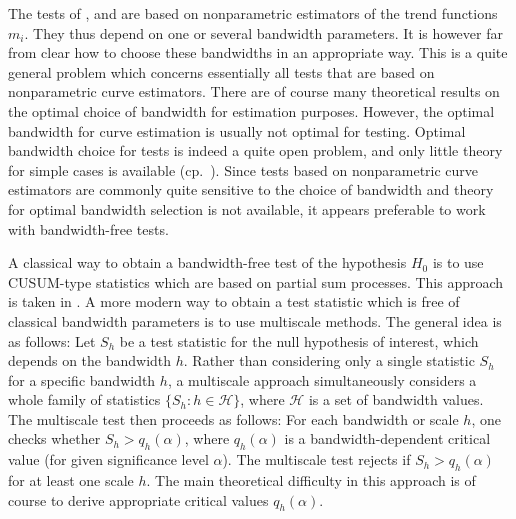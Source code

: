 \documentclass[a4paper,12pt]{article}
\begin{document}
The tests of \cite{Zhang2012}, \cite{DegrasWu2012} and \cite{ChenWu2018} are based on nonparametric estimators of the trend functions $m_i$. They thus depend on one or several bandwidth parameters. It is however far from clear how to choose these bandwidths in an appropriate way. This is a quite general problem which concerns essentially all tests that are based on nonparametric curve estimators. There are of course many theoretical results on the optimal choice of bandwidth for estimation purposes. However, the optimal bandwidth for curve estimation is usually not optimal for testing. Optimal bandwidth choice for tests is indeed a quite open problem, and only little theory for simple cases is available (cp.\ \cite{GaoGijbels2008}). Since tests based on nonparametric curve estimators are commonly quite sensitive to the choice of bandwidth and theory for optimal bandwidth selection is not available, it appears preferable to work with bandwidth-free tests. 


A classical way to obtain a bandwidth-free test of the hypothesis $H_0$ is to use CUSUM-type statistics which are based on partial sum processes. This approach is taken in \cite{Hidalgo2014}. 
%
%
A more modern way to obtain a test statistic which is free of classical bandwidth parameters is to use multiscale methods. The general idea is as follows: Let $S_h$ be a test statistic for the null hypothesis of interest, which depends on the bandwidth $h$. Rather than considering only a single statistic $S_h$ for a specific bandwidth $h$, a multiscale approach simultaneously considers a whole family of statistics $\{S_h: h \in \mathcal{H} \}$, where $\mathcal{H}$ is a set of bandwidth values. The multiscale test then proceeds as follows: For each bandwidth or scale $h$, one checks whether $S_h > q_h(\alpha)$, where $q_h(\alpha)$ is a bandwidth-dependent critical value (for given significance level $\alpha$). The multiscale test rejects if $S_h > q_h(\alpha)$ for at least one scale $h$. The main theoretical difficulty in this approach is of course to derive appropriate critical values $q_h(\alpha)$. 
\end{document}
